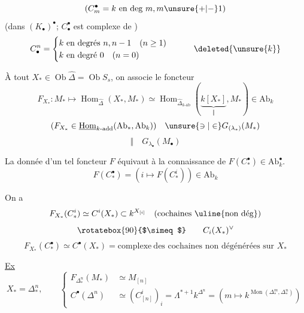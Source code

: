 \[
(C_m^\bullet=k\ \text{en deg }m,m\unsure{+|-}1)
\]
(dans $(K_\bullet)^\bullet$; $C_\bullet^\bullet$ est complexe de  )
\[
C_\bullet^n=\begin{cases}
k\ \text{en degrés }n,n-1\quad(n\geq1)\\
k\ \text{en degré }0\quad(n=0)
\end{cases}
\qquad\deleted{\unsure{k}}
\]


À tout $X_*\in\operatorname{Ob}\widehat\Delta=\operatorname{Ob}S_s$,
on associe le foncteur
\[
F_{X_*}:M_*\longmapsto\operatorname{Hom}_{\widehat\Delta}(X_*,M_*)
\simeq\operatorname{Hom}_{\widehat\Delta_{k\text{-ab}}}
(\underbrace{k[X_*]}_{\Vert},M_*)\in\mathrm{Ab}_k
\]
\[
(F_{X_*}\in\underline{\operatorname{Hom}}_{k\text{-add}}(\mathrm{Ab}_*,\mathrm{Ab}_k))
\quad\unsure{\ni|\in}G_{(\lambda_*)}(M_*)
\]
\[
\Vert\quad G_{\lambda_\bullet}(M_\bullet)
\]

La donnée d'un tel foncteur $F$ 
équivaut à la connaissance de $F(C_*^\bullet)\in\mathrm{Ab}_k^\bullet$.
\[
F(C_*^\bullet)=(i\longmapsto F(C_*^i))\in\mathrm{Ab}_k
\]

On a
\[
F_{X_*}(C_*^i)\simeq C^i(X_*)\subset k^{X_{[i]}}
\quad(\text{cochaines \uline{non dég}})
\]
\[
\rotatebox{90}{$\simeq$}\qquad C_i(X_*)^\vee
\]
\[
F_{X_*}(C_*^\bullet)\simeq C^\bullet(X_*)
=\text{complexe}\ \text{des cochaines non dégénérées sur }X_*
\]

\uline{Ex}
\[
X_* =\Delta_*^n,\qquad
\left\{\begin{aligned}
F_{\Delta_*^n}(M_*)&\simeq M_{[n]}\\
C^\bullet(\Delta^n)&\simeq(C_{[n]}^i)_i
=\Lambda^{*+1}k^{\Delta^n}
=(m\longmapsto k^{\operatorname{Mon}(\Delta_*^m,\Delta_*^n)})
\end{aligned}\right.
\]

